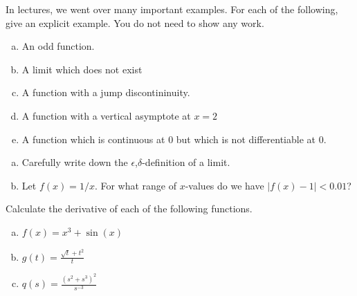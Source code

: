 \documentclass[11pt]{exam}
\theoremstyle{definition}
\begin{document}
\begin{questions}
\newpage
\question[10]\mbox{}
In lectures, we went over many important examples.
For each of the following, give an explicit example.
You do not need to show any work.
\begin{enumerate}[(a)]
\item  An odd function.
\vspace{1.5in}
\item  A limit which does not exist
\vspace{1.5in}
\item  A function with a jump discontininuity.
\vspace{1.5in}
\item  A function with a vertical asymptote at $x=2$
\vspace{1.5in}
\item  A function which is continuous at $0$ but which is not differentiable at $0$.
\vspace{1.5in}
\end{enumerate}


\newpage
\question[10]
\begin{enumerate}[(a)]
\item Carefully write down the $\epsilon$,$\delta$-definition of a limit.
\vspace{2in}
\item Let $f(x) = 1/x$.  For what range of $x$-values do we have $|f(x)-1| < 0.01$?
\end{enumerate}

\newpage
\question[10]
Calculate the derivative of each of the following functions.
\begin{enumerate}[(a)]
\item $f(x) = x^3 + \sin(x)$
\vspace{2in}
\item $g(t) = \frac{\sqrt{t} + t^2}{t}$
\vspace{3in}
\item $q(s) = \frac{(s^2+s^3)^2}{s^{-3}}$
\end{enumerate}


\end{questions}
\end{document}
